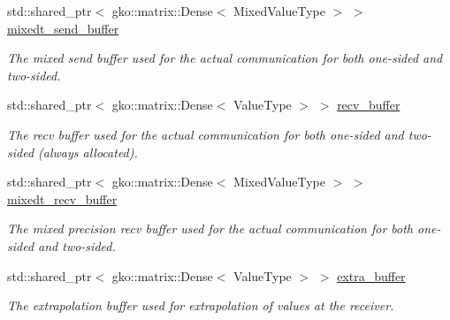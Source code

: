 \begin{DoxyCompactItemize}
\mbox{\label{structschwz_1_1Communicate_1_1comm__struct_a357d96eeeb734a275f78782e7e6542a8}} 
std\+::shared\+\_\+ptr$<$ gko\+::matrix\+::\+Dense$<$ Mixed\+Value\+Type $>$ $>$ \hyperlink{structschwz_1_1Communicate_1_1comm__struct_a357d96eeeb734a275f78782e7e6542a8}{mixedt\+\_\+send\+\_\+buffer}
\begin{DoxyCompactList}\small\item\em The mixed send buffer used for the actual communication for both one-\/sided and two-\/sided. \end{DoxyCompactList}\item 
\mbox{\label{structschwz_1_1Communicate_1_1comm__struct_a7b02126d598b9054b9adf0ebc9b3138c}} 
std\+::shared\+\_\+ptr$<$ gko\+::matrix\+::\+Dense$<$ Value\+Type $>$ $>$ \hyperlink{structschwz_1_1Communicate_1_1comm__struct_a7b02126d598b9054b9adf0ebc9b3138c}{recv\+\_\+buffer}
\begin{DoxyCompactList}\small\item\em The recv buffer used for the actual communication for both one-\/sided and two-\/sided (always allocated). \end{DoxyCompactList}\item 
\mbox{\label{structschwz_1_1Communicate_1_1comm__struct_a93ca78673122ad09e24bebd0b1ec9750}} 
std\+::shared\+\_\+ptr$<$ gko\+::matrix\+::\+Dense$<$ Mixed\+Value\+Type $>$ $>$ \hyperlink{structschwz_1_1Communicate_1_1comm__struct_a93ca78673122ad09e24bebd0b1ec9750}{mixedt\+\_\+recv\+\_\+buffer}
\begin{DoxyCompactList}\small\item\em The mixed precision recv buffer used for the actual communication for both one-\/sided and two-\/sided. \end{DoxyCompactList}\item 
\mbox{\label{structschwz_1_1Communicate_1_1comm__struct_a3e207eb58b3c8ce0a3d500b8c8354b3b}} 
std\+::shared\+\_\+ptr$<$ gko\+::matrix\+::\+Dense$<$ Value\+Type $>$ $>$ \hyperlink{structschwz_1_1Communicate_1_1comm__struct_a3e207eb58b3c8ce0a3d500b8c8354b3b}{extra\+\_\+buffer}
\begin{DoxyCompactList}\small\item\em The extrapolation buffer used for extrapolation of values at the receiver. \end{DoxyCompactList}\item 

\end{DoxyCompactItemize}
